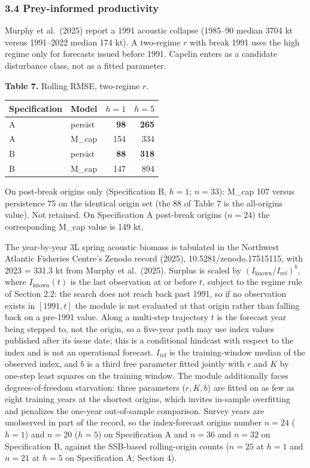 \documentclass[11pt]{article}
\begin{document}
\subsubsection{3.4 Prey-informed
productivity}\label{prey-informed-productivity}

Murphy et al.~(2025) report a 1991 acoustic collapse (1985--90 median
3704 kt versus 1991--2022 median 174 kt). A two-regime \(r\) with break
1991 uses the high regime only for forecasts issued before 1991. Capelin
enters as a candidate disturbance class, not as a fitted parameter.

\textbf{Table 7.} Rolling RMSE, two-regime \(r\).

\begin{longtable}[]{@{}llrr@{}}
\toprule\noalign{}
Specification & Model & \(h=1\) & \(h=5\) \\
\midrule\noalign{}
\endhead
\bottomrule\noalign{}
\endlastfoot
A & persist & \textbf{98} & \textbf{265} \\
A & M\_cap & 154 & 334 \\
B & persist & \textbf{88} & \textbf{318} \\
B & M\_cap & 147 & 894 \\
\end{longtable}

On post-break origins only (Specification B, \(h=1\); \(n=33\)): M\_cap
107 versus persistence 75 on the identical origin set (the 88 of Table 7
is the all-origins value). Not retained. On Specification A post-break
origins (\(n=24\)) the corresponding M\_cap value is 149 kt.

The year-by-year 3L spring acoustic biomass is tabulated in the
Northwest Atlantic Fisheries Centre's Zenodo record (2025),
10.5281/zenodo.17515115, with 2023 = 331.3 kt from Murphy et al.~(2025).
Surplus is scaled by \((I_{\mathrm{known}}/I_{\mathrm{ref}})^{b}\),
where \(I_{\mathrm{known}}(t)\) is the last observation at or before
\(t\), subject to the regime rule of Section 2.2: the search does not
reach back past 1991, so if no observation exists in \([1991, t]\) the
module is not evaluated at that origin rather than falling back on a
pre-1991 value. Along a multi-step trajectory \(t\) is the forecast
year being stepped to, not the origin, so a five-year path may use index
values published after its issue date; this is a conditional hindcast
with respect to the index and is not an operational forecast. \(I_{\mathrm{ref}}\) is the training-window median of the
observed index, and \(b\) is a third free parameter fitted jointly with
\(r\) and \(K\) by one-step least squares on the training window. The
module additionally faces degrees-of-freedom starvation: three
parameters (\(r, K, b\)) are fitted on as few as eight training years at
the shortest origins, which invites in-sample overfitting and penalizes
the one-year out-of-sample comparison. Survey years are unobserved in
part of the record, so the index-forecast origins number \(n=24\)
(\(h=1\)) and \(n=20\) (\(h=5\)) on Specification A and \(n=36\) and
\(n=32\) on Specification B, against the SSB-based rolling-origin counts
(\(n=25\) at \(h=1\) and \(n=21\) at \(h=5\) on Specification A; Section
4).
\end{document}
